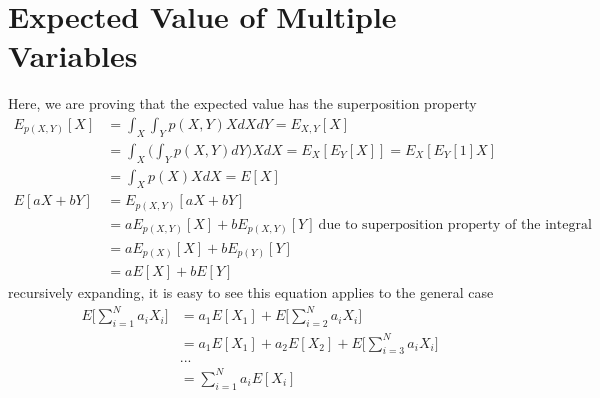 \documentclass{book}
\numberwithin{equation}{subsection}
\begin{document}
\section{Expected Value of Multiple Variables}
\label{multi_mean_derivation}
Here, we are proving that the expected value has the superposition property
\begin{align}
     E_{p(X,Y)}[X]
     &= \int_X\int_Y p(X,Y)X dX dY = E_{X,Y}[X]\\
     &= \int_X\Big(\int_Y p(X,Y)dY\Big) X dX = E_{X}[E_{Y}[X]] = E_{X}[E_{Y}[1]X]\\
     &= \int_X p(X) X dX = E[X]\\
    E[aX+bY]
    &= E_{p(X,Y)}[aX+bY]\\
    &= aE_{p(X,Y)}[X]+bE_{p(X,Y)}[Y]\ \text{due to superposition property of the integral}\\
    &= aE_{p(X)}[X]+bE_{p(Y)}[Y]\\
    &= aE[X]+bE[Y]
\end{align}
recursively expanding, it is easy to see this equation applies to the general case
\begin{align}
    E\big[\sum_{i=1}^N a_iX_i\big] &= a_1E[X_1]+E\big[\sum_{i=2}^N a_iX_i\big]\\
    &= a_1E[X_1]+a_2E[X_2]+E\big[\sum_{i=3}^N a_iX_i\big]\\
    & ...\\
    &= \sum_{i=1}^N a_iE[X_i]~\label{mean_superpos}
\end{align}
\end{document}
